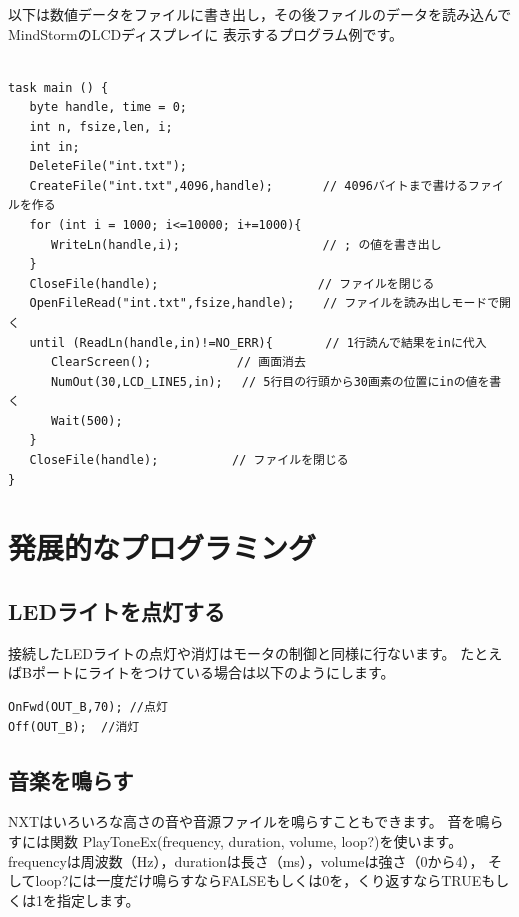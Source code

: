 \documentclass[11pt]{jarticle}
\begin{document}
以下は数値データをファイルに書き出し，その後ファイルのデータを読み込んでMindStormのLCDディスプレイに
表示するプログラム例です。

\begin{screen}{\small
\begin{verbatim}

task main () { 
   byte handle, time = 0; 
   int n, fsize,len, i; 
   int in; 
   DeleteFile("int.txt"); 
   CreateFile("int.txt",4096,handle);　　　  // 4096バイトまで書けるファイルを作る 
   for (int i = 1000; i<=10000; i+=1000){ 
      WriteLn(handle,i); 　　　　　　　　　    // ; の値を書き出し
   } 
   CloseFile(handle); 　　　　　　　　　　　   // ファイルを閉じる
   OpenFileRead("int.txt",fsize,handle);    // ファイルを読み出しモードで開く
   until (ReadLn(handle,in)!=NO_ERR){ 　　   // 1行読んで結果をinに代入
      ClearScreen(); 　　　　　　 // 画面消去
      NumOut(30,LCD_LINE5,in); 　// 5行目の行頭から30画素の位置にinの値を書く
      Wait(500); 
   } 
   CloseFile(handle); 　　　　　 // ファイルを閉じる
} 
\end{verbatim}}
\end{screen}



\section{発展的なプログラミング}

\subsection{LEDライトを点灯する}
接続したLEDライトの点灯や消灯はモータの制御と同様に行ないます。
たとえばBポートにライトをつけている場合は以下のようにします。
\begin{screen}
\begin{verbatim}
OnFwd(OUT_B,70); //点灯
Off(OUT_B);  //消灯
\end{verbatim}
\end{screen}

\subsection{音楽を鳴らす}
NXTはいろいろな高さの音や音源ファイルを鳴らすこともできます。
音を鳴らすには関数
PlayToneEx(frequency, duration, volume, loop?)を使います。
frequencyは周波数（Hz），durationは長さ（ms），volumeは強さ（0から4），
そしてloop?には一度だけ鳴らすならFALSEもしくは0を，くり返すならTRUEもしくは1を指定します。
\end{document}
